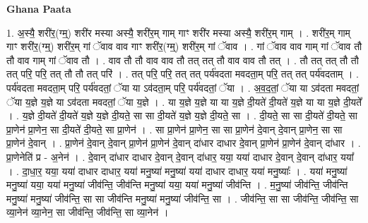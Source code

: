 \documentclass[17pt]{extarticle}
\begin{document}
\textbf{Ghana Paata } \newline

1. अ॒स्यै॒ शरी॑र॒(ग्म्॒) शरी॑र मस्या अस्यै॒ शरी॑र॒म् गाम् गाꣳ शरी॑र मस्या अस्यै॒ शरी॑र॒म् गाम् । . शरी॑र॒म् गाम् गाꣳ शरी॑र॒(ग्म्॒) शरी॑र॒म् गां ॅवाव वाव गाꣳ शरी॑र॒(ग्म्॒) शरी॑र॒म् गां ॅवाव । . गां ॅवाव वाव गाम् गां ॅवाव तौ तौ वाव गाम् गां ॅवाव तौ । . वाव तौ तौ वाव वाव तौ तत् तत् तौ वाव वाव तौ तत् । . तौ तत् तत् तौ तौ तत् परि॒ परि॒ तत् तौ तौ तत् परि॑ । . तत् परि॒ परि॒ तत् तत् पर्य॑वदता मवदता॒म् परि॒ तत् तत् पर्य॑वदताम् । . पर्य॑वदता मवदता॒म् परि॒ पर्य॑वदतां॒ ॅया या ऽव॑दता॒म् परि॒ पर्य॑वदतां॒ ॅया । . अ॒व॒द॒तां॒ ॅया या ऽव॑दता मवदतां॒ ॅया य॒ज्ञे य॒ज्ञे या ऽव॑दता मवदतां॒ ॅया य॒ज्ञे । . या य॒ज्ञे य॒ज्ञे या या य॒ज्ञे दी॒यते॑ दी॒यते॑ य॒ज्ञे या या य॒ज्ञे दी॒यते᳚ । . य॒ज्ञे दी॒यते॑ दी॒यते॑ य॒ज्ञे य॒ज्ञे दी॒यते॒ सा सा दी॒यते॑ य॒ज्ञे य॒ज्ञे दी॒यते॒ सा । . दी॒यते॒ सा सा दी॒यते॑ दी॒यते॒ सा प्रा॒णेन॑ प्रा॒णेन॒ सा दी॒यते॑ दी॒यते॒ सा प्रा॒णेन॑ । . सा प्रा॒णेन॑ प्रा॒णेन॒ सा सा प्रा॒णेन॑ दे॒वान् दे॒वान् प्रा॒णेन॒ सा सा प्रा॒णेन॑ दे॒वान् । . प्रा॒णेन॑ दे॒वान् दे॒वान् प्रा॒णेन॑ प्रा॒णेन॑ दे॒वान् दा॑धार दाधार दे॒वान् प्रा॒णेन॑ प्रा॒णेन॑ दे॒वान् दा॑धार । . प्रा॒णेनेति॑ प्र - अ॒नेन॑ । . दे॒वान् दा॑धार दाधार दे॒वान् दे॒वान् दा॑धार॒ यया॒ यया॑ दाधार दे॒वान् दे॒वान् दा॑धार॒ यया᳚ । . दा॒धा॒र॒ यया॒ यया॑ दाधार दाधार॒ यया॑ मनु॒ष्या॑ मनु॒ष्या॑ यया॑ दाधार दाधार॒ यया॑ मनु॒ष्याः᳚ । . यया॑ मनु॒ष्या॑ मनु॒ष्या॑ यया॒ यया॑ मनु॒ष्या॑ जीव॑न्ति॒ जीव॑न्ति मनु॒ष्या॑ यया॒ यया॑ मनु॒ष्या॑ जीव॑न्ति । . म॒नु॒ष्या॑ जीव॑न्ति॒ जीव॑न्ति मनु॒ष्या॑ मनु॒ष्या॑ जीव॑न्ति॒ सा सा जीव॑न्ति मनु॒ष्या॑ मनु॒ष्या॑ जीव॑न्ति॒ सा । . जीव॑न्ति॒ सा सा जीव॑न्ति॒ जीव॑न्ति॒ सा व्या॒नेन॑ व्या॒नेन॒ सा जीव॑न्ति॒ जीव॑न्ति॒ सा व्या॒नेन॑ । \newline
\end{document}
